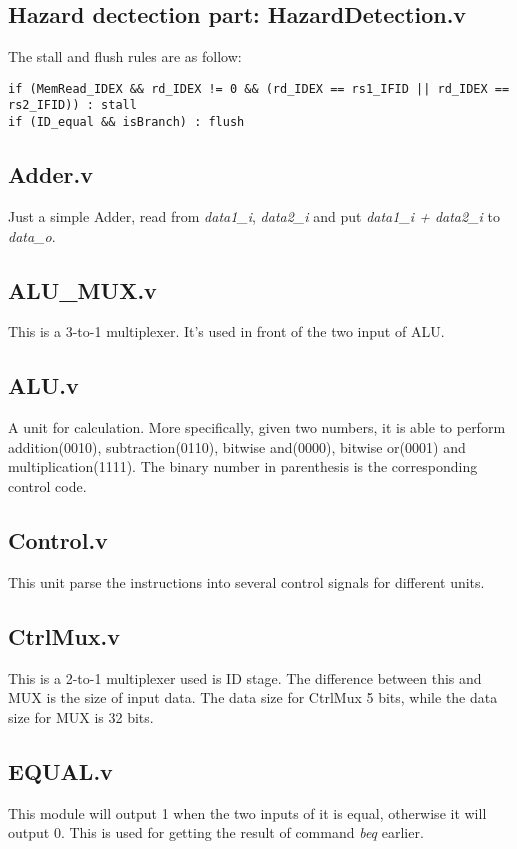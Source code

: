 \documentclass{article}
\begin{document}
\subsection{Hazard dectection part: HazardDetection.v}
The stall and flush rules are as follow:

\begin{lstlisting}[language=text, caption=Rules, xleftmargin=10pt, xrightmargin=10pt, mathescape=true]
if (MemRead_IDEX && rd_IDEX != 0 && (rd_IDEX == rs1_IFID || rd_IDEX == rs2_IFID)) : stall
if (ID_equal && isBranch) : flush\end{lstlisting}

\subsection{Adder.v}
Just a simple Adder, read from \textit{data1\_i}, \textit{data2\_i} and put \textit{data1\_i + data2\_i} to \textit{data\_o}.

\subsection{ALU\_MUX.v}
This is a 3-to-1 multiplexer. It's used in front of the two input of ALU.

\subsection{ALU.v}
A unit for calculation. More specifically, given two numbers, it is able to perform addition(0010), subtraction(0110), bitwise and(0000), bitwise or(0001) and multiplication(1111). The binary number in parenthesis is the corresponding control code.

\subsection{Control.v}
This unit parse the instructions into several control signals for different units.

\subsection{CtrlMux.v}
This is a 2-to-1 multiplexer used is ID stage. The difference between this and MUX is the size of input data. The data size for CtrlMux 5 bits, while the data size for MUX is 32 bits.

\subsection{EQUAL.v}
This module will output 1 when the two inputs of it is equal, otherwise it will output 0. This is used for getting the result of command \textit{beq} earlier.
\end{document}
